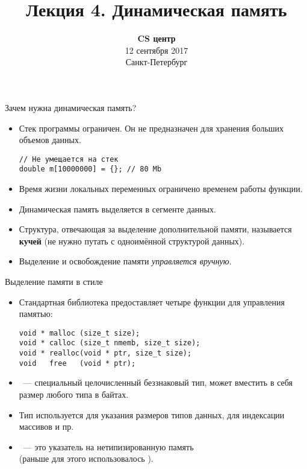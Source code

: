 \documentclass{beamer}
\title{Лекция 4. Динамическая память}
\date{
   \textbf{CS центр}\\
   12 сентября 2017 \\
   Санкт-Петербург
}
\begin{document}
\begin{frame} 
  \titlepage
\end{frame}

\begin{frame}[fragile]{Зачем нужна динамическая память?}
    \begin{itemize}
        \item Стек программы ограничен. Он не предназначен
            для хранения больших объемов данных.
\begin{lstlisting}
// Не умещается на стек
double m[10000000] = {}; // 80 Mb
\end{lstlisting}

        \item Время жизни локальных переменных ограничено
            временем работы функции.

        \item Динамическая память выделяется в сегменте данных.

        \item Структура, отвечающая за выделение дополнительной
            памяти, называется {\bf кучей} (не нужно путать
            с одноимённой структурой данных).

        \item Выделение и освобождение памяти {\em управляется вручную}.
    \end{itemize}
\end{frame}

\begin{frame}[fragile]{Выделение памяти в стиле \langc}
    \begin{itemize}
        \item Стандартная библиотека 
            предоставляет четыре функции для управления памятью:
            {\small
\begin{lstlisting}
void * malloc (size_t size);
void * calloc (size_t nmemb, size_t size);
void * realloc(void * ptr, size_t size);
void   free   (void * ptr);
\end{lstlisting}
}
        \item {}~--- специальный целочисленный беззнаковый тип, 
            может вместить в себя размер любого типа в байтах.

        \item Тип  используется для указания размеров типов данных,
            для индексации массивов и пр.

        \item {}~--- это указатель на нетипизированную память\\
            (раньше для этого использовалось ).

    \end{itemize}
\end{frame}
\end{document}
